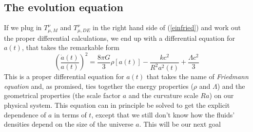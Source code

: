 \subsection{The evolution equation} 
If we plug in $T_{\mu,M}^\nu$ and $T_{\mu,DE}^\nu$ in the right hand side of (\ref{einfried}) and work out the proper differential calculations, we end up with a differential equation for $a(t)$, that takes the remarkable form 
\begin{equation}
\label{friedmanneq}
\left(\frac{\dot{a}(t)}{a(t)}\right)^2=\frac{8\pi G}{3}\rho[a(t)]-\frac{kc^2}{R^2a^2(t)}+\frac{\Lambda c^2}{3}
\end{equation}
This is a proper differential equation for $a(t)$ that takes the name of \textit{Friedmann equation} and, as promised, ties together the energy properties ($\rho$ and $\Lambda$) and the geometrical properties (the scale factor $a$ and the curvature scale $Ra$) on our physical system. This equation can in principle be solved to get the explicit dependence of $a$ in terms of $t$, except that we still don't know how the fluids' densities depend on the size of the universe $a$. This will be our next goal
